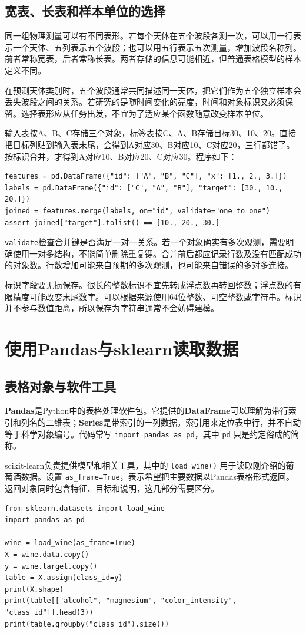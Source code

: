 \subsection{宽表、长表和样本单位的选择}
同一组物理测量可以有不同表形。若每个天体在五个波段各测一次，可以用一行表示一个天体、五列表示五个波段；也可以用五行表示五次测量，增加波段名称列。前者常称宽表，后者常称长表。两者存储的信息可能相近，但普通表格模型的样本定义不同。

在预测天体类别时，五个波段通常共同描述同一天体，把它们作为五个独立样本会丢失波段之间的关系。若研究的是随时间变化的亮度，时间和对象标识又必须保留。选择表形应从任务出发，不宜为了适应某个函数随意改变样本单位。

输入表按A、B、C存储三个对象，标签表按C、A、B存储目标30、10、20。直接把目标列贴到输入表末尾，会得到A对应30、B对应10、C对应20，三行都错了。按标识合并，才得到A对应10、B对应20、C对应30。程序如下：
\begin{lstlisting}
features = pd.DataFrame({"id": ["A", "B", "C"], "x": [1., 2., 3.]})
labels = pd.DataFrame({"id": ["C", "A", "B"], "target": [30., 10., 20.]})
joined = features.merge(labels, on="id", validate="one_to_one")
assert joined["target"].tolist() == [10., 20., 30.]
\end{lstlisting}
\texttt{validate}检查合并键是否满足一对一关系。若一个对象确实有多次观测，需要明确使用一对多结构，不能简单删除重复键。合并前后都应记录行数及没有匹配成功的对象数。行数增加可能来自预期的多次观测，也可能来自错误的多对多连接。

标识字段要无损保存。很长的整数标识不宜先转成浮点数再转回整数；浮点数的有限精度可能改变末尾数字。可以根据来源使用64位整数、可空整数或字符串。标识并不参与数值距离，所以保存为字符串通常不会妨碍建模。

\section{使用Pandas与sklearn读取数据}
\subsection{表格对象与软件工具}
\textbf{Pandas}是Python中的表格处理软件包。它提供的\textbf{DataFrame}可以理解为带行索引和列名的二维表；\textbf{Series}是带索引的一列数据。索引用来定位表中行，并不自动等于科学对象编号。代码常写 \texttt{import pandas as pd}，其中 \texttt{pd} 只是约定俗成的简称。

scikit-learn负责提供模型和相关工具，其中的 \texttt{load\_wine()} 用于读取刚介绍的葡萄酒数据。设置 \texttt{as\_frame=True}，表示希望把主要数据以Pandas表格形式返回。返回对象同时包含特征、目标和说明，这几部分需要区分。
\begin{lstlisting}[caption={先读取葡萄酒数据，再检查表格角色}]
from sklearn.datasets import load_wine
import pandas as pd

wine = load_wine(as_frame=True)
X = wine.data.copy()
y = wine.target.copy()
table = X.assign(class_id=y)
print(X.shape)
print(table[["alcohol", "magnesium", "color_intensity", "class_id"]].head(3))
print(table.groupby("class_id").size())
\end{lstlisting}

